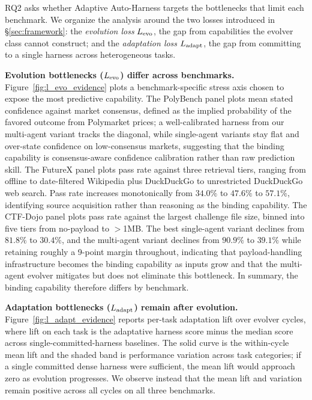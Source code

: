 RQ2 asks whether Adaptive Auto-Harness targets the bottlenecks that limit each benchmark. We organize the analysis around the two losses introduced in \S\ref{sec:framework}: the \emph{evolution loss} $L_{\text{evo}}$, the gap from capabilities the evolver class cannot construct; and the \emph{adaptation loss} $L_{\text{adapt}}$, the gap from committing to a single harness across heterogeneous tasks.

\noindent\textbf{Evolution bottlenecks ($L_{\text{evo}}$) differ across benchmarks.} Figure~\ref{fig:l_evo_evidence} plots a benchmark-specific stress axis chosen to expose the most predictive capability. The PolyBench panel plots mean stated confidence against market consensus, defined as the implied probability of the favored outcome from Polymarket prices; a well-calibrated harness from our multi-agent variant tracks the diagonal, while single-agent variants stay flat and over-state confidence on low-consensus markets, suggesting that the binding capability is consensus-aware confidence calibration rather than raw prediction skill. The FutureX panel plots pass rate against three retrieval tiers, ranging from offline to date-filtered Wikipedia plus DuckDuckGo to unrestricted DuckDuckGo web search. Pass rate increases monotonically from $34.0\%$ to $47.6\%$ to $57.1\%$, identifying source acquisition rather than reasoning as the binding capability. The CTF-Dojo panel plots pass rate against the largest challenge file size, binned into five tiers from no-payload to $>$1MB. The best single-agent variant declines from $81.8\%$ to $30.4\%$, and the multi-agent variant declines from $90.9\%$ to $39.1\%$ while retaining roughly a 9-point margin throughout, indicating that payload-handling infrastructure becomes the binding capability as inputs grow and that the multi-agent evolver mitigates but does not eliminate this bottleneck. In summary, the binding capability therefore differs by benchmark.

\noindent\textbf{Adaptation bottlenecks ($L_{\text{adapt}}$) remain after evolution.} Figure~\ref{fig:l_adapt_evidence} reports per-task adaptation lift over evolver cycles, where lift on each task is the adaptative harness score minus the median score across single-committed-harness baselines. The solid curve is the within-cycle mean lift and the shaded band is performance variation across task categories; if a single committed dense harness were sufficient, the mean lift would approach zero as evolution progresses. We observe instead that the mean lift and variation remain positive across all cycles on all three benchmarks. 

